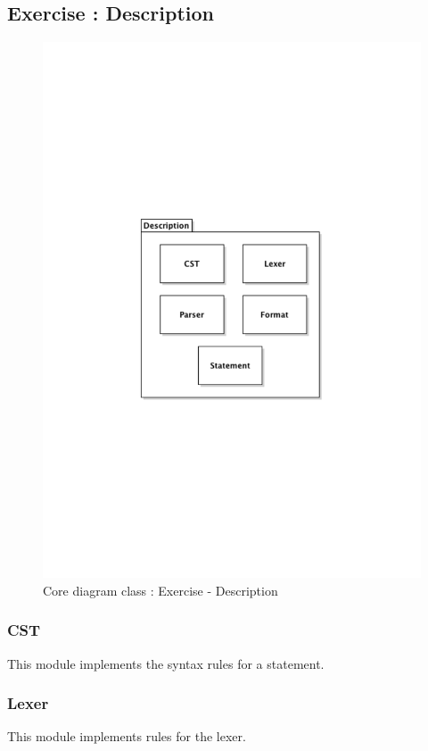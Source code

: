 	\subsection{Exercise : Description}
		\begin{figure}[ht]
			\begin{center}
				\includegraphics[width=\textwidth,  trim=2cm 10cm 2cm 9cm]{UML_figure/DC/core/exercise/DC_Description.pdf}
				\caption{Core diagram class : Exercise - Description}
			\end{center}
		\end{figure}
		\subsubsection{CST}
			This module implements the syntax rules for a statement.
		\subsubsection{Lexer}
			This module implements rules for the lexer.
